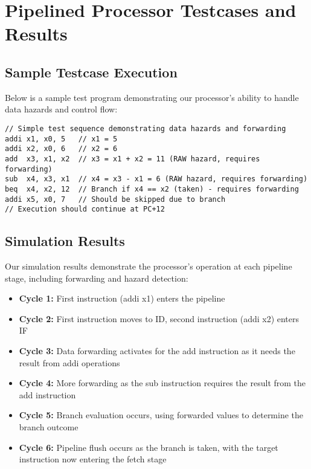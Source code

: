 \documentclass[conference]{IEEEtran}
\begin{document}
\section{Pipelined Processor Testcases and Results}

\subsection{Sample Testcase Execution}

Below is a sample test program demonstrating our processor's ability to handle data hazards and control flow:

\begin{lstlisting}[caption=Test Program]
// Simple test sequence demonstrating data hazards and forwarding
addi x1, x0, 5   // x1 = 5
addi x2, x0, 6   // x2 = 6
add  x3, x1, x2  // x3 = x1 + x2 = 11 (RAW hazard, requires forwarding)
sub  x4, x3, x1  // x4 = x3 - x1 = 6 (RAW hazard, requires forwarding)
beq  x4, x2, 12  // Branch if x4 == x2 (taken) - requires forwarding
addi x5, x0, 7   // Should be skipped due to branch
// Execution should continue at PC+12
\end{lstlisting}

\subsection{Simulation Results}

Our simulation results demonstrate the processor's operation at each pipeline stage, including forwarding and hazard detection:

\begin{itemize}
    \item \textbf{Cycle 1:} First instruction (addi x1) enters the pipeline
    \item \textbf{Cycle 2:} First instruction moves to ID, second instruction (addi x2) enters IF
    \item \textbf{Cycle 3:} Data forwarding activates for the add instruction as it needs the result from addi operations
    \item \textbf{Cycle 4:} More forwarding as the sub instruction requires the result from the add instruction
    \item \textbf{Cycle 5:} Branch evaluation occurs, using forwarded values to determine the branch outcome
    \item \textbf{Cycle 6:} Pipeline flush occurs as the branch is taken, with the target instruction now entering the fetch stage
\end{itemize}
\end{document}

